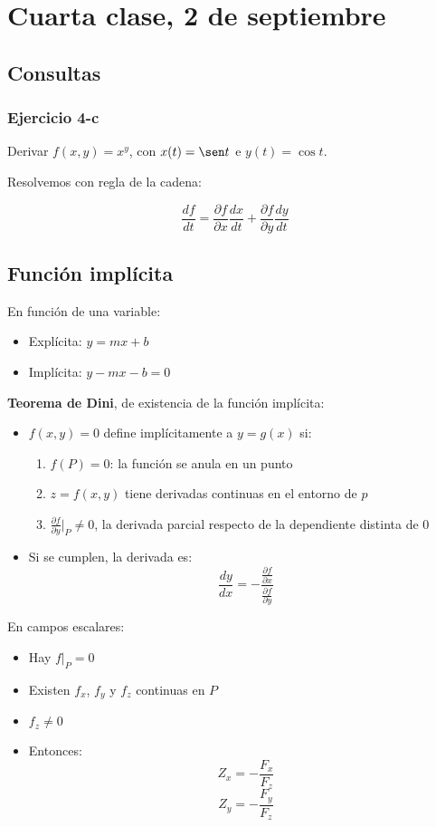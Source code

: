 \section{Cuarta clase, 2 de septiembre}

\subsection{Consultas}

\subsubsection{Ejercicio 4-c}

Derivar $f(x,y) = x^{y}$, con $x(t)=\sen t$ e $y(t) = \cos t$.

Resolvemos con regla de la cadena:

$$\frac{df}{dt} = \frac{\partial f}{\partial x}\frac{dx}{dt} + \frac{\partial f}{\partial y}\frac{dy}{dt}$$

\subsection{Función implícita}

En función de una variable:
\begin{itemize}
    \item Explícita: $y = mx + b$
    \item Implícita: $y - mx - b = 0$
\end{itemize}

\textbf{Teorema de Dini}, de existencia de la función implícita:
\begin{itemize}
    \item $f(x,y) = 0$ define implícitamente a $y = g(x)$ si:
          \begin{enumerate}
              \item $f(P) = 0$: la función se anula en un punto
              \item $z=f(x,y)$ tiene derivadas continuas en el entorno de $p$
              \item $\frac{\partial f}{\partial y}|_P \neq 0$, la derivada parcial
                    respecto de la dependiente distinta de 0
          \end{enumerate}
    \item Si se cumplen, la derivada es:
          $$\frac{dy}{dx} = -\frac{\frac{\partial f}{\partial x}}{\frac{\partial f}{\partial y}}$$
\end{itemize}

En campos escalares:
\begin{itemize}
    \item Hay $f|_P = 0$
    \item Existen $f_x$, $f_y$ y $f_z$ continuas en $P$
    \item $f_z \neq 0$
    \item Entonces:
          $$Z_x = -\frac{F_x}{F_z}$$
          $$Z_y = -\frac{F_y}{F_z}$$
\end{itemize}
